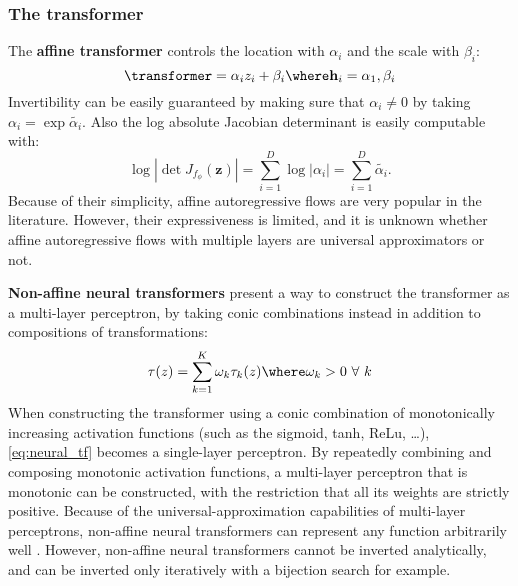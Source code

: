 \documentclass[english]{scrartcl}
\begin{document}
    \subsubsection{The transformer}

    The \textbf{affine transformer} controls the location with $\alpha_i$ and the scale with $\beta_i$:
    \begin{equation}
        \transformer = \alpha_i z_i +\beta _i \where \textbf{h}_i = {\alpha_1, \beta_i}
    \end{equation}
    Invertibility can be easily guaranteed by making sure that $\alpha _i \neq 0$ by taking $\alpha _i = \exp \tilde{\alpha _i}$.
    Also the log absolute Jacobian determinant is easily computable with:
    \begin{equation}
        \log |\det J_{f_\phi}(\textbf{z})| = \sum _{i=1} ^{D} \log |\alpha _i| = \sum _{i=1} ^{D} \tilde{\alpha _i}.
    \end{equation}
    Because of their simplicity, affine autoregressive flows are very popular in the literature.
    However, their expressiveness is limited, and it is unknown whether affine autoregressive flows with multiple layers are universal approximators or not.

    \textbf{Non-affine neural transformers} present a way to construct the transformer as a multi-layer perceptron, by taking conic combinations instead in addition to compositions of transformations:
    \begin{equation}
        \label{eq:neural_tf}
        \tau (z) = \sum _{k=1} ^{K} \omega_k \tau _k(z) \where\omega_k > 0\ \forall\ k
    \end{equation}
    When constructing the transformer using a conic combination of monotonically increasing activation functions (such as the sigmoid, tanh, ReLu, \ldots), \cref{eq:neural_tf} becomes a single-layer perceptron.
    By repeatedly combining and composing monotonic activation functions, a multi-layer perceptron that is monotonic can be constructed, with the restriction that all its weights are strictly positive.
    Because of the universal-approximation capabilities of multi-layer perceptrons, non-affine neural transformers can represent any function arbitrarily well \parencite{huang_neural_2018}.
    However, non-affine neural transformers cannot be inverted analytically, and can be inverted only iteratively with a bijection search for example.
\end{document}
